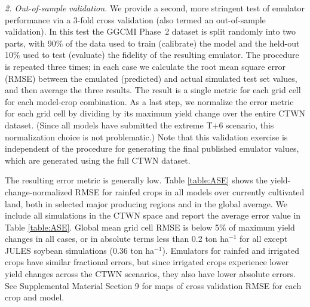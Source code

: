 \documentclass[gmdd]{copernicus} %
\begin{document}
\smallskip
\textit{2. Out-of-sample validation.} 
We provide a second, more stringent test of emulator performance via a 3-fold cross validation (also termed an out-of-sample validation). 
In this test the GGCMI Phase~2 dataset is split randomly into two parts, with 90\% of the data used to train (calibrate) the model and the held-out 10\% used to test (evaluate) the fidelity of the resulting emulator. The procedure is repeated three times; in each case we calculate the root mean square error (RMSE) between the emulated (predicted) and actual simulated test set values, and then average the three results. The result is a single metric for each grid cell for each model-crop combination.
As a last step, we normalize the error metric for each grid cell by dividing by its maximum yield change over the entire CTWN dataset. (Since all models have submitted the extreme T+6 scenario, this normalization choice is not problematic.) Note that this validation exercise is independent of the procedure for generating the final published emulator values, which are generated using the full CTWN dataset.

The resulting error metric is generally low.
Table \ref{table:ASE} shows the yield-change-normalized RMSE for rainfed crops in all models over currently cultivated land, both in selected major producing regions and in the global average. We include all simulations in the CTWN space and report the average error value in Table \ref{table:ASE}. 
Global mean grid cell RMSE is below 5\% of maximum yield changes in all cases, or in absolute terms 
less than 0.2 ton ha$^{-1}$ for all except JULES soybean simulations (0.36 ton ha$^{-1}$).
Emulators for rainfed and irrigated crops have similar fractional errors, but since  
irrigated crops experience lower yield changes across the CTWN scenarios, they also have lower absolute errors. 
See Supplemental Material Section 9 for maps of cross validation RMSE for each crop and model.
\end{document}
